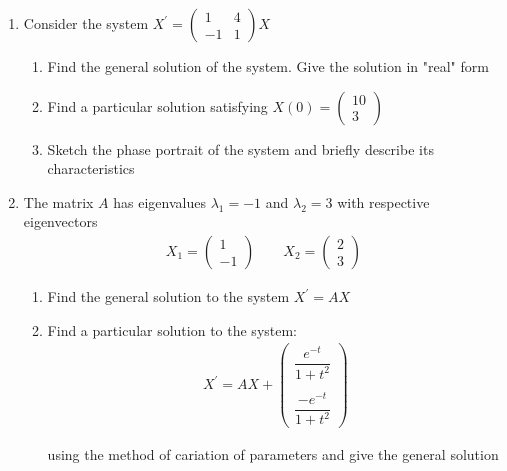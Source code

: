 \begin{enumerate}
  \item Consider the system $X^{\prime} = \begin{pmatrix}1&4\\-1&1\end{pmatrix}X$

    \begin{enumerate}
      \item Find the general solution of the system. Give the solution in "real" form
      \item Find a particular solution satisfying $X(0) = \begin{pmatrix}10\\3\end{pmatrix}$ 
      \item Sketch the phase portrait of the system and briefly describe its characteristics
    \end{enumerate}
    \par\bigskip

  \item The matrix $A$ has eigenvalues $\lambda_1 = -1$ and $\lambda_2 = 3$ with respective eigenvectors
    \begin{equation*}
      \begin{gathered}
        X_1 = \begin{pmatrix}1\\-1\end{pmatrix}\qquad X_2 = \begin{pmatrix}2\\3\end{pmatrix}
      \end{gathered}
    \end{equation*}
    \par\bigskip
    \begin{enumerate}
      \item Find the general solution to the system $X^{\prime} = AX$
      \item Find a particular solution to the system:
        \begin{equation*}
          \begin{gathered}
            X^{\prime} = AX+\begin{pmatrix}\dfrac{e^{-t}}{1+t^2}\\\\\dfrac{-e^{-t}}{1+t^2}\end{pmatrix}
          \end{gathered}
        \end{equation*}\par
        \noindent using the method of cariation of parameters and give the general solution
    \end{enumerate}
\end{enumerate}
